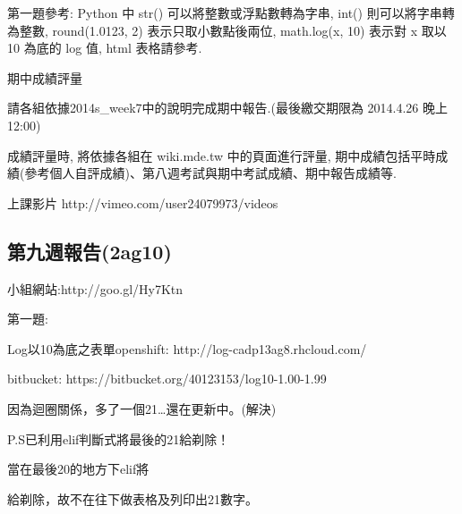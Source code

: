 \documentclass[]{article}
\begin{document}
第一題參考: Python 中 str() 可以將整數或浮點數轉為字串, int()
則可以將字串轉為整數, round(1.0123, 2) 表示只取小數點後兩位, math.log(x,
10) 表示對 x 取以 10 為底的 log 值, html 表格請參考.

期中成績評量

請各組依據2014s\_week7中的說明完成期中報告.(最後繳交期限為 2014.4.26
晚上 12:00)

成績評量時, 將依據各組在 wiki.mde.tw 中的頁面進行評量,
期中成績包括平時成績(參考個人自評成績)、第八週考試與期中考試成績、期中報告成績等.

上課影片 http://vimeo.com/user24079973/videos

\subsection{第九週報告(2ag10)}\label{ux7b2cux4e5dux9031ux5831ux544a2ag10}

小組網站:http://goo.gl/Hy7Ktn

第一題:

Log以10為底之表單openshift: http://log-cadp13ag8.rhcloud.com/

bitbucket: https://bitbucket.org/40123153/log10-1.00-1.99

因為迴圈關係，多了一個21\ldots{}還在更新中。(解決)

P.S已利用elif判斷式將最後的21給剃除！

當在最後20的地方下elif將

給剃除，故不在往下做表格及列印出21數字。
\end{document}
